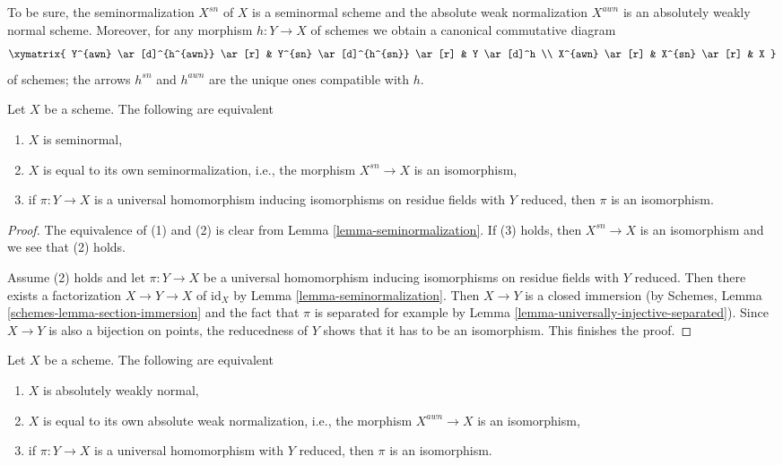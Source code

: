 \noindent
To be sure, the seminormalization $X^{sn}$ of $X$ is a seminormal
scheme and the absolute weak normalization $X^{awn}$ is an
absolutely weakly normal scheme.
Moreover, for any morphism $h : Y \to X$ of schemes we obtain a
canonical commutative diagram
$$
\xymatrix{
Y^{awn} \ar[d]^{h^{awn}} \ar[r] &
Y^{sn} \ar[d]^{h^{sn}} \ar[r] &
Y \ar[d]^h \\
X^{awn} \ar[r] &
X^{sn} \ar[r] &
X
}
$$
of schemes; the arrows $h^{sn}$ and $h^{awn}$ are the unique
ones compatible with $h$.

\begin{lemma}
\label{lemma-characterize-seminormal}
Let $X$ be a scheme. The following are equivalent
\begin{enumerate}
\item $X$ is seminormal,
\item $X$ is equal to its own seminormalization, i.e., the morphism
$X^{sn} \to X$ is an isomorphism,
\item if $\pi : Y \to X$ is a universal homomorphism inducing isomorphisms
on residue fields with $Y$ reduced, then $\pi$ is an isomorphism.
\end{enumerate}
\end{lemma}

\begin{proof}
The equivalence of (1) and (2) is clear from
Lemma \ref{lemma-seminormalization}. If (3) holds, then $X^{sn} \to X$
is an isomorphism and we see that (2) holds.

\medskip\noindent
Assume (2) holds and let $\pi : Y \to X$ be a universal homomorphism
inducing isomorphisms on residue fields with $Y$ reduced. Then there exists
a factorization $X \to Y \to X$ of $\text{id}_X$ by
Lemma \ref{lemma-seminormalization}. Then $X \to Y$ is a closed immersion
(by Schemes, Lemma \ref{schemes-lemma-section-immersion}
and the fact that $\pi$ is separated for example by
Lemma \ref{lemma-universally-injective-separated}). Since $X \to Y$
is also a bijection on points, the reducedness of $Y$ shows that it
has to be an isomorphism. This finishes the proof.
\end{proof}

\begin{lemma}
\label{lemma-characterize-absolutely-weakly-normal}
Let $X$ be a scheme. The following are equivalent
\begin{enumerate}
\item $X$ is absolutely weakly normal,
\item $X$ is equal to its own absolute weak normalization, i.e., the morphism
$X^{awn} \to X$ is an isomorphism,
\item if $\pi : Y \to X$ is a universal homomorphism with $Y$ reduced, then
$\pi$ is an isomorphism.
\end{enumerate}
\end{lemma}

